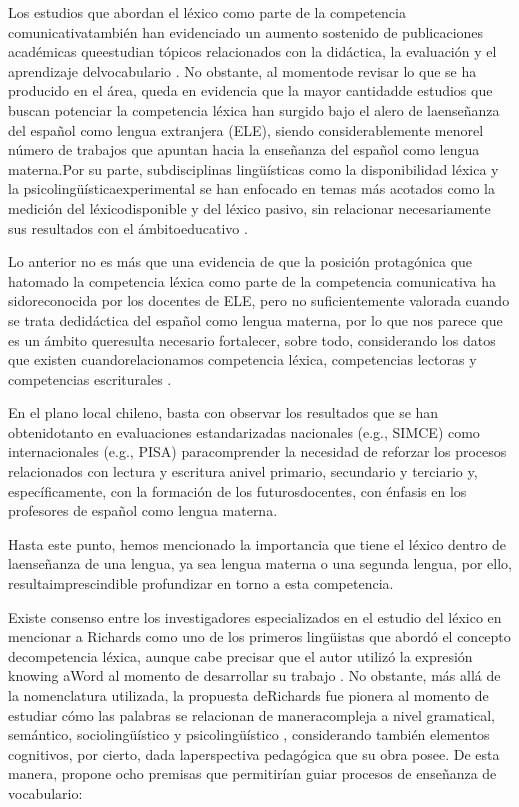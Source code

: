 \documentclass{textolivre}
\begin{document}
Los estudios que abordan el léxico como parte de la competencia
comunicativatambién han evidenciado un aumento sostenido de publicaciones
académicas queestudian tópicos relacionados con la didáctica, la evaluación y
el aprendizaje delvocabulario \cite{perfetti2001,rufat2016}. No
obstante, al momentode revisar lo que se ha producido en el área, queda en
evidencia que la mayor cantidadde estudios que buscan potenciar la competencia
léxica han surgido bajo el alero de laenseñanza del español como lengua
extranjera (ELE), siendo considerablemente menorel número de trabajos que
apuntan hacia la enseñanza del español como lengua materna.Por su parte,
subdisciplinas lingüísticas como la disponibilidad léxica y la
psicolingüísticaexperimental se han enfocado en temas más acotados como la
medición del léxicodisponible y del léxico pasivo, sin relacionar
necesariamente sus resultados con el ámbitoeducativo \cite{GermanyG2000,echeverria1987,RiffoOcares2014}.

Lo anterior no es más que una evidencia de que la posición protagónica que
hatomado la competencia léxica como parte de la competencia comunicativa ha
sidoreconocida por los docentes de ELE, pero no suficientemente valorada cuando
se trata dedidáctica del español como lengua materna, por lo que nos parece que
es un ámbito queresulta necesario fortalecer, sobre todo, considerando los
datos que existen cuandorelacionamos competencia léxica, competencias lectoras
y competencias escriturales \cite{GonzaloZapico2016,Zapico2017,kaur,Pinto2019}.

En el plano local chileno, basta con observar los resultados que se han
obtenidotanto en evaluaciones estandarizadas nacionales (e.g., SIMCE) como
internacionales (e.g., PISA) \cite{VillarroelHenrquez2015,FigueroaSeplveda2018}
paracomprender la necesidad de reforzar los procesos relacionados
con lectura y escritura anivel primario, secundario y terciario y,
específicamente, con la formación de los futurosdocentes, con énfasis en los
profesores de español como lengua materna.

Hasta este punto, hemos mencionado la importancia que tiene el léxico dentro de
laenseñanza de una lengua, ya sea lengua materna o una segunda lengua, por
ello, resultaimprescindible profundizar en torno a esta competencia.

Existe consenso entre los investigadores especializados en el estudio del
léxico en mencionar a Richards como uno de los primeros lingüistas que abordó
el concepto decompetencia léxica, aunque cabe precisar que el autor utilizó la
expresión knowing aWord al momento de desarrollar su trabajo \cite{Richards1976,Choudhury2015,Velsquez2016}.
No obstante, más allá de la nomenclatura
utilizada, la propuesta deRichards fue pionera al momento de estudiar cómo las
palabras se relacionan de maneracompleja a nivel gramatical, semántico,
sociolingüístico y psicolingüístico \cite{catalan2002}, considerando
también elementos cognitivos, por cierto, dada laperspectiva pedagógica que su
obra posee. De esta manera, \textcite[p. 78--83]{Richards1976} propone ocho premisas que
permitirían guiar procesos de enseñanza de vocabulario:
\end{document}
